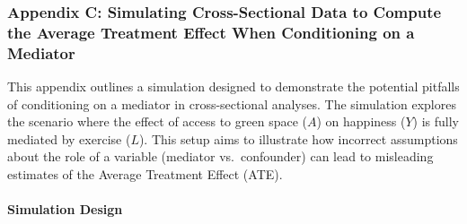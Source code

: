 \documentclass[
  singlecolumn]{article}
\let\oldparagraph\paragraph
\renewcommand{\paragraph}[1]{\oldparagraph{#1}\mbox{}}
\begin{document}
\newpage{}

\subsubsection{Appendix C: Simulating Cross-Sectional Data to Compute
the Average Treatment Effect When Conditioning on a
Mediator}\label{appendix-c}

This appendix outlines a simulation designed to demonstrate the
potential pitfalls of conditioning on a mediator in cross-sectional
analyses. The simulation explores the scenario where the effect of
access to green space (\(A\)) on happiness (\(Y\)) is fully mediated by
exercise (\(L\)). This setup aims to illustrate how incorrect
assumptions about the role of a variable (mediator vs.~confounder) can
lead to misleading estimates of the Average Treatment Effect (ATE).

\paragraph{Simulation Design}\label{simulation-design}
\end{document}
